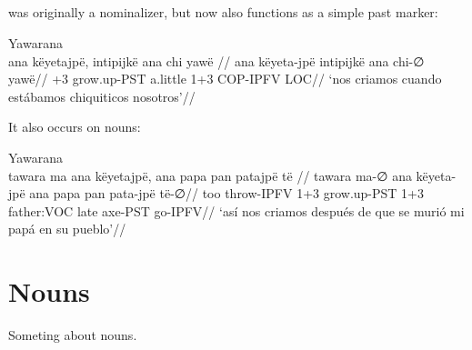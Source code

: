 \documentclass{article}
\begin{document}
\subsection{}

 was originally a nominalizer, but now also functions as a
simple past marker:

 Yawarana \\
\begingl
\glpreamble ana këyetajpë, intipijkë ana chi yawë //
\gla ana këyeta-jpë intipijkë ana chi-∅ yawë//
+3 grow.up-PST a.little 1+3 COP-IPFV LOC//
\glft ‘nos criamos cuando estábamos chiquiticos nosotros’//  
\endgl 
\xe

It also occurs on nouns:

 Yawarana \\
\begingl
\glpreamble tawara ma ana këyetajpë, ana papa pan patajpë të //
\gla tawara ma-∅ ana këyeta-jpë ana papa pan pata-jpë të-∅//
\glb too throw-IPFV 1+3 grow.up-PST 1+3 father:VOC late axe-PST go-IPFV//
\glft ‘así nos criamos después de que se murió mi papá en su pueblo’//  
\endgl 
\xe


\section{Nouns}

Someting about nouns.

\printbibliography

% 
% 
% 
% 
% 
% 
% 
% 
% 
\end{document}
